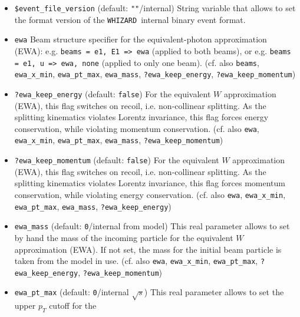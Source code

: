\documentclass[12pt]{book}
\newcommand{\ttt}[1]{\texttt{#1}}
\newcommand{\whizard}{\texttt{WHIZARD}}
\begin{document}
\begin{itemize}
Evaluator that tells \whizard\ to evaluate the following expr:
\ttt{eval {\em <expr>}}. Examples are: \ttt{eval Rap [e1]}, \ttt{eval
  M / 1 GeV [combine [q,Q]]} etc. (cf. also \ttt{cuts},
\ttt{selection}, \ttt{record})
\item
\ttt{\$event\_file\_version} \qquad (default: \ttt{""}/internal)
\newline 
String variable that allows to set the format version of the \whizard\
internal binary event format. 
\item
\ttt{ewa} \newline
Beam structure specifier for the equivalent-photon approximation
(EWA): e.g. \ttt{beams = e1, E1 => ewa} (applied to both beams), or
e.g. \ttt{beams = e1, u => ewa, none} (applied to only one
beam). (cf. also \ttt{beams}, \ttt{ewa\_x\_min}, \ttt{ewa\_pt\_max},
\ttt{ewa\_mass}, \ttt{?ewa\_keep\_energy}, 
\ttt{?ewa\_keep\_momentum}) 
\item
\ttt{?ewa\_keep\_energy} \qquad (default: \ttt{false}) \newline
For the equivalent $W$ approximation (EWA), this flag switches on
recoil, i.e. non-collinear splitting. As the splitting kinematics
violates Lorentz invariance, this flag forces energy conservation,
while violating momentum conservation. (cf. also \ttt{ewa},
\ttt{ewa\_x\_min}, \ttt{ewa\_pt\_max},  \ttt{ewa\_mass},
\ttt{?ewa\_keep\_momentum}) 
\item
\ttt{?ewa\_keep\_momentum} \qquad (default: \ttt{false}) \newline
For the equivalent $W$ approximation (EWA), this flag switches on
recoil, i.e. non-collinear splitting. As the splitting kinematics
violates Lorentz invariance, this flag forces momentum conservation,
while violating energy conservation. (cf. also \ttt{ewa},
\ttt{ewa\_x\_min}, \ttt{ewa\_pt\_max},  \ttt{ewa\_mass},
\ttt{?ewa\_keep\_energy}) 
\item
\ttt{ewa\_mass} \qquad (default: \ttt{0}/internal from model) \newline 
This real parameter allows to set by hand the mass of the incoming
particle for the equivalent $W$ approximation (EWA). If not
set, the mass for the initial beam particle is taken from the model in
use. (cf. also \ttt{ewa}, \ttt{ewa\_x\_min}, \ttt{ewa\_pt\_max}, 
\ttt{?ewa\_keep\_energy}, \ttt{?ewa\_keep\_momentum}) 
\item
\ttt{ewa\_pt\_max} \qquad (default: \ttt{0}/internal $\sqrt{s}$)
\newline
This real parameter allows to set the upper $p_T$ cutoff for the

\end{itemize}
\end{document}
